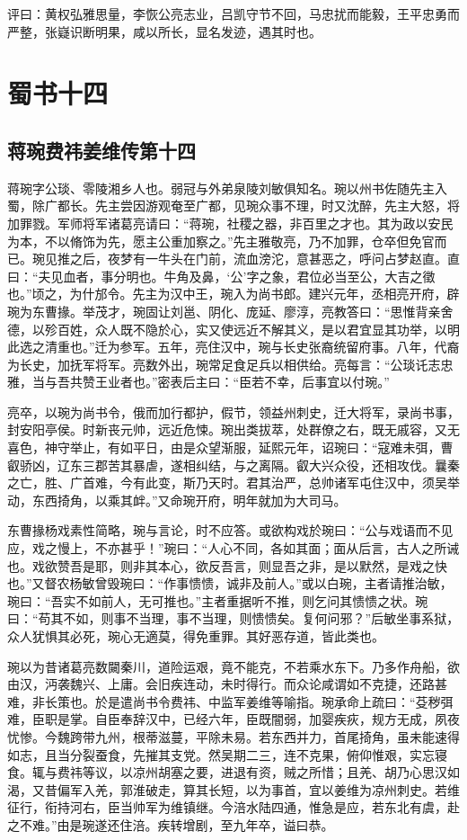 \documentclass[12pt,UTF8]{ctexbook}
\begin{document}
评曰：黄权弘雅思量，李恢公亮志业，吕凯守节不回，马忠扰而能毅，王平忠勇而严整，张嶷识断明果，咸以所长，显名发迹，遇其时也。

\part{蜀书十四}
\chapter{蒋琬费祎姜维传第十四}

蒋琬字公琰、零陵湘乡人也。弱冠与外弟泉陵刘敏俱知名。琬以州书佐随先主入蜀，除广都长。先主尝因游观奄至广都，见琬众事不理，时又沈醉，先主大怒，将加罪戮。军师将军诸葛亮请曰：“蒋琬，社稷之器，非百里之才也。其为政以安民为本，不以脩饰为先，愿主公重加察之。”先主雅敬亮，乃不加罪，仓卒但免官而已。琬见推之后，夜梦有一牛头在门前，流血滂沱，意甚恶之，呼问占梦赵直。直曰：“夫见血者，事分明也。牛角及鼻，‘公’字之象，君位必当至公，大吉之徵也。”顷之，为什邡令。先主为汉中王，琬入为尚书郎。建兴元年，丞相亮开府，辟琬为东曹掾。举茂才，琬固让刘邕、阴化、庞延、廖淳，亮教答曰：“思惟背亲舍德，以殄百姓，众人既不隐於心，实又使远近不解其义，是以君宜显其功举，以明此选之清重也。”迁为参军。五年，亮住汉中，琬与长史张裔统留府事。八年，代裔为长史，加抚军将军。亮数外出，琬常足食足兵以相供给。亮每言：“公琰讬志忠雅，当与吾共赞王业者也。”密表后主曰：“臣若不幸，后事宜以付琬。”

亮卒，以琬为尚书令，俄而加行都护，假节，领益州刺史，迁大将军，录尚书事，封安阳亭侯。时新丧元帅，远近危悚。琬出类拔萃，处群僚之右，既无戚容，又无喜色，神守举止，有如平日，由是众望渐服，延熙元年，诏琬曰：“寇难未弭，曹叡骄凶，辽东三郡苦其暴虐，遂相纠结，与之离隔。叡大兴众役，还相攻伐。曩秦之亡，胜、广首难，今有此变，斯乃天时。君其治严，总帅诸军屯住汉中，须吴举动，东西掎角，以乘其衅。”又命琬开府，明年就加为大司马。

东曹掾杨戏素性简略，琬与言论，时不应答。或欲构戏於琬曰：“公与戏语而不见应，戏之慢上，不亦甚乎！”琬曰：“人心不同，各如其面；面从后言，古人之所诫也。戏欲赞吾是耶，则非其本心，欲反吾言，则显吾之非，是以默然，是戏之快也。”又督农杨敏曾毁琬曰：“作事愦愦，诚非及前人。”或以白琬，主者请推治敏，琬曰：“吾实不如前人，无可推也。”主者重据听不推，则乞问其愦愦之状。琬曰：“苟其不如，则事不当理，事不当理，则愦愦矣。复何问邪？”后敏坐事系狱，众人犹惧其必死，琬心无適莫，得免重罪。其好恶存道，皆此类也。

琬以为昔诸葛亮数闚秦川，道险运艰，竟不能克，不若乘水东下。乃多作舟船，欲由汉，沔袭魏兴、上庸。会旧疾连动，未时得行。而众论咸谓如不克捷，还路甚难，非长策也。於是遣尚书令费祎、中监军姜维等喻指。琬承命上疏曰：“芟秽弭难，臣职是掌。自臣奉辞汉中，已经六年，臣既闇弱，加婴疾疢，规方无成，夙夜忧惨。今魏跨带九州，根蒂滋蔓，平除未易。若东西并力，首尾掎角，虽未能速得如志，且当分裂蚕食，先摧其支党。然吴期二三，连不克果，俯仰惟艰，实忘寝食。辄与费祎等议，以凉州胡塞之要，进退有资，贼之所惜；且羌、胡乃心思汉如渴，又昔偏军入羌，郭淮破走，算其长短，以为事首，宜以姜维为凉州刺史。若维征行，衔持河右，臣当帅军为维镇继。今涪水陆四通，惟急是应，若东北有虞，赴之不难。”由是琬遂还住涪。疾转增剧，至九年卒，谥曰恭。
\end{document}
